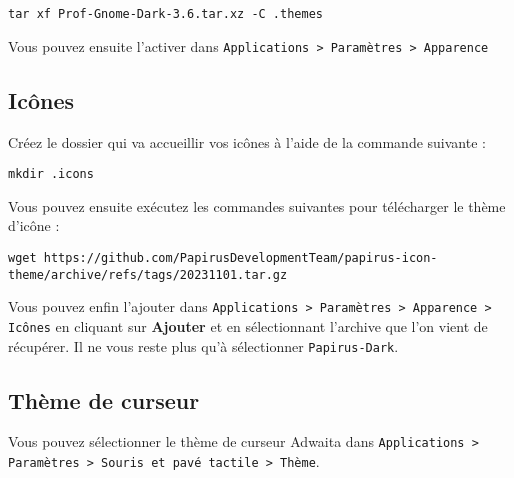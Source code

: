 \begin{lstlisting}
tar xf Prof-Gnome-Dark-3.6.tar.xz -C .themes
\end{lstlisting}

Vous pouvez ensuite l'activer dans \texttt{Applications > Paramètres > Apparence}

\subsection{Icônes}

Créez le dossier qui va accueillir vos icônes à l'aide de la commande suivante :

\begin{lstlisting}
mkdir .icons
\end{lstlisting}

Vous pouvez ensuite exécutez les commandes suivantes pour télécharger le thème d'icône :

\begin{lstlisting}
wget https://github.com/PapirusDevelopmentTeam/papirus-icon-theme/archive/refs/tags/20231101.tar.gz
\end{lstlisting}

Vous pouvez enfin l'ajouter dans \texttt{Applications > Paramètres > Apparence > Icônes} en cliquant sur \textbf{Ajouter} et en sélectionnant l'archive que l'on vient de récupérer. Il ne vous reste plus qu'à sélectionner \texttt{Papirus-Dark}.

\subsection{Thème de curseur}

Vous pouvez sélectionner le thème de curseur Adwaita dans \texttt{Applications > Paramètres > Souris et pavé tactile > Thème}.